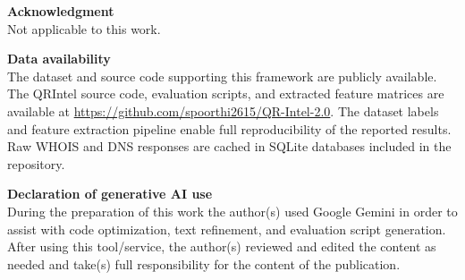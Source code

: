 \documentclass[10pt,twocolumn,letterpaper]{article}
\begin{document}
\medskip
\textbf{Acknowledgment}\\
Not applicable to this work.

\medskip
\textbf{Data availability}\\
The dataset and source code supporting this framework are publicly available. The QRIntel source code, evaluation scripts, and extracted feature matrices are available at \url{https://github.com/spoorthi2615/QR-Intel-2.0}. The dataset labels and feature extraction pipeline enable full reproducibility of the reported results. Raw WHOIS and DNS responses are cached in SQLite databases included in the repository.

\medskip
\textbf{Declaration of generative AI use}\\
During the preparation of this work the author(s) used Google Gemini in order to assist with code optimization, text refinement, and evaluation script generation. After using this tool/service, the author(s) reviewed and edited the content as needed and take(s) full responsibility for the content of the publication.
\end{document}

